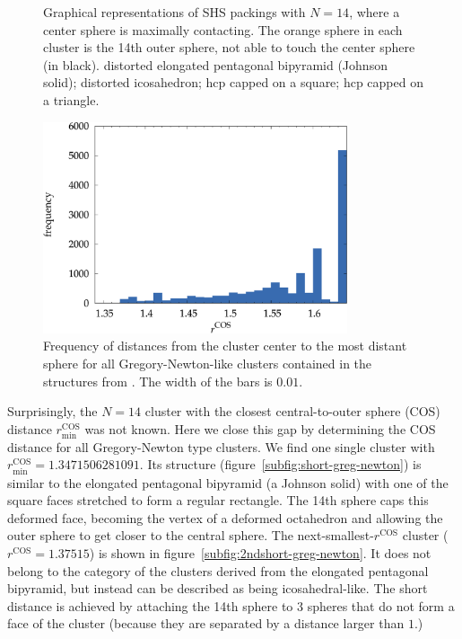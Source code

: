 \begin{figure}
    \caption{Graphical representations of \acs{SHS} packings with $N=14$, where
    a center sphere is maximally contacting. The orange sphere in each cluster
    is the 14th outer sphere, not able to touch the center sphere (in black).
    \protect{} distorted elongated pentagonal
    bipyramid (Johnson solid); \protect{}
    distorted icosahedron; \protect{} hcp capped
    on a square; \protect{} hcp capped on a
    triangle.}
    \label{fig:N14}
\end{figure}

\begin{figure}
    \centering
    \includegraphics[width=0.8\textwidth]{gregory-newton/greg-newton.pdf}
    \caption{Frequency of distances from the cluster center to the most distant
    sphere for all Gregory-Newton-like clusters contained in the structures
    from \citeauthor{Holmes-Cerfon_EnumeratingRigidSphere_2016}\autocite{Holmes-Cerfon_EnumeratingRigidSphere_2016}. The width of the bars is $0.01$.}
    \label{fig:greg-newton}
\end{figure}


Surprisingly, the $N = 14$ cluster with the closest central-to-outer sphere
(COS) distance $r_\text{min}^\text{COS}$ was not known. Here we close this gap by
determining the COS distance for all Gregory-Newton type clusters.  We find one
single cluster with $r_\text{min}^\text{COS}=1.3471506281091$.  Its structure
(figure~\ref{subfig:short-greg-newton}) is similar to the elongated pentagonal bipyramid (a
Johnson solid) with one of the square faces stretched to form a regular
rectangle.  The 14th sphere caps this deformed face, becoming the vertex of a
deformed octahedron and allowing the outer sphere to get closer to the central
sphere.  The next-smallest-$r^\text{COS}$ cluster ($r^\text{COS} = 1.37515$) is
shown in figure~\ref{subfig:2ndshort-greg-newton}.  It does not belong to the
category of the clusters derived from the elongated pentagonal bipyramid, but
instead can be described as being icosahedral-like.  The short distance is
achieved by attaching the 14th sphere to 3 spheres that do not form a face of
the cluster (because they are separated by a distance larger than $1$.)


